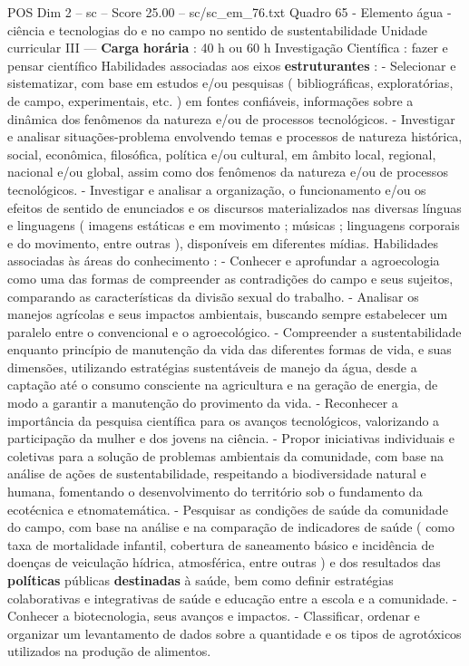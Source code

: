 \begin{textsample}{POS Dim 2 – sc – Score 25.00 – sc/sc\_em\_76.txt}
Quadro 65 - Elemento água - ciência e tecnologias do e no campo no sentido de sustentabilidade Unidade curricular III — \textbf{Carga} \textbf{horária} : 40 h ou 60 h Investigação Científica : fazer e pensar científico Habilidades associadas aos eixos \textbf{estruturantes} : - Selecionar e sistematizar, com base em estudos e/ou pesquisas ( bibliográficas, exploratórias, de campo, experimentais, etc. ) em fontes confiáveis, informações sobre a dinâmica dos fenômenos da natureza e/ou de processos tecnológicos. - Investigar e analisar situações-problema envolvendo temas e processos de natureza histórica, social, econômica, filosófica, política e/ou cultural, em âmbito local, regional, nacional e/ou global, assim como dos fenômenos da natureza e/ou de processos tecnológicos. - Investigar e analisar a organização, o funcionamento e/ou os efeitos de sentido de enunciados e os discursos materializados nas diversas línguas e linguagens ( imagens estáticas e em movimento ; músicas ; linguagens corporais e do movimento, entre outras ), disponíveis em diferentes mídias.
Habilidades associadas às áreas do conhecimento : - Conhecer e aprofundar a agroecologia como uma das formas de compreender as contradições do campo e seus sujeitos, comparando as características da divisão sexual do trabalho. - Analisar os manejos agrícolas e seus impactos ambientais, buscando sempre estabelecer um paralelo entre o convencional e o agroecológico. - Compreender a sustentabilidade enquanto princípio de manutenção da vida das diferentes formas de vida, e suas dimensões, utilizando estratégias sustentáveis de manejo da água, desde a captação até o consumo consciente na agricultura e na geração de energia, de modo a garantir a manutenção do provimento da vida. - Reconhecer a importância da pesquisa científica para os avanços tecnológicos, valorizando a participação da mulher e dos jovens na ciência. - Propor iniciativas individuais e coletivas para a solução de problemas ambientais da comunidade, com base na análise de ações de sustentabilidade, respeitando a biodiversidade natural e humana, fomentando o desenvolvimento do território sob o fundamento da ecotécnica e etnomatemática. - Pesquisar as condições de saúde da comunidade do campo, com base na análise e na comparação de indicadores de saúde ( como taxa de mortalidade infantil, cobertura de saneamento básico e incidência de doenças de veiculação hídrica, atmosférica, entre outras ) e dos resultados das \textbf{políticas} públicas \textbf{destinadas} à saúde, bem como definir estratégias colaborativas e integrativas de saúde e educação entre a escola e a comunidade. - Conhecer a biotecnologia, seus avanços e impactos. - Classificar, ordenar e organizar um levantamento de dados sobre a quantidade e os tipos de agrotóxicos utilizados na produção de alimentos.

\end{textsample}
